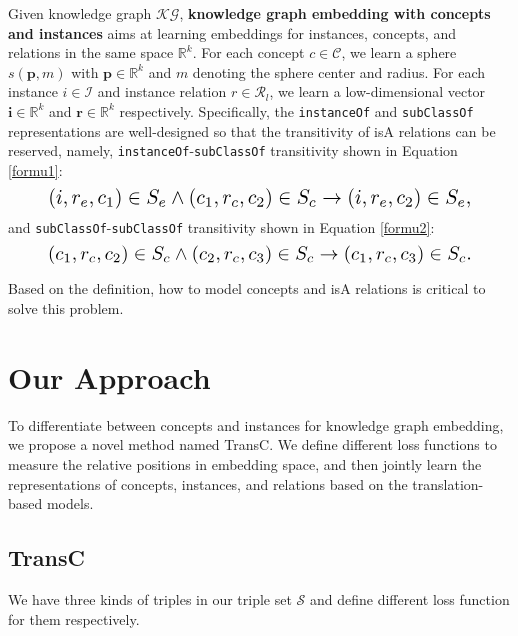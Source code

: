 \documentclass[11pt,a4paper]{article}
\begin{document}
  Given knowledge graph $\mathcal{KG}$, \textbf{knowledge graph 
  embedding with concepts and instances} aims at learning embeddings for instances, 
  concepts, and relations in the same space $\mathbb{R}^k$. For each concept $c \in \mathcal{C}$, 
  we learn a sphere $s(\mathbf{p}, m)$ with $\mathbf{p} \in \mathbb{R}^k$ and $m$ denoting the sphere 
  center and radius. For each instance $i \in \mathcal{I}$ and instance relation $r \in \mathcal{R}_l$,
  we learn a low-dimensional vector $\mathbf{i} \in \mathbb{R}^k$ and $\mathbf{r} \in \mathbb{R}^k$ 
  respectively. Specifically, the \texttt{instanceOf} and \texttt{subClassOf} representations 
  are well-designed so that the transitivity of isA relations can be reserved, namely,
  \texttt{instanceOf}-\texttt{subClassOf} transitivity shown in Equation \ref{formu1}:
  \begin{equation}\label{formu1}
    \resizebox{.88\hsize}{!}{$(i, r_e, c_1)\in S_e \wedge (c_1, r_c, c_2)\in S_c \rightarrow (i, r_e, c_2)\in S_e,$}
  \end{equation}
  and \texttt{subClassOf}-\texttt{subClassOf} transitivity shown in Equation \ref{formu2}:
  \begin{equation}\label{formu2}
    \resizebox{.88\hsize}{!}{$(c_1, r_c, c_2)\in S_c \wedge (c_2, r_c, c_3)\in S_c \rightarrow (c_1, r_c, c_3)\in S_c.$}
  \end{equation} 
  
  Based on the definition, how to model concepts and isA relations is critical to solve this problem.
  
  
  \section{Our Approach}
  
  To differentiate between concepts and instances for knowledge graph embedding, 
  we propose a novel method named TransC.  
  We define different loss functions to measure the relative positions in embedding space, and then
  jointly learn the representations of concepts, instances, and relations based on the 
  translation-based models.
  
  \subsection{TransC}
  
  We have three kinds of triples in our triple set $\mathcal{S}$ and define different loss function for them respectively.
  
\end{document}
